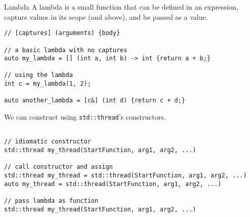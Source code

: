\begin{definitionbox}{Lambda}
    A lambda is a small function that can be defined in an expression, capture values in its scope (and above), and be passed as a value.
    \begin{verbatim}
// [captures] (arguments) {body}

// a basic lambda with no captures
auto my_lambda = [] (int a, int b) -> int {return a + b;}

// using the lambda
int c = my_lambda(1, 2);

auto another_lambda = [c&] (int d) {return c + d;}
    \end{verbatim} 
\end{definitionbox}
We can construct using \texttt{std::thread}'s constructors.
\begin{verbatim}

// idiomatic constructor
std::thread my_thread(StartFunction, arg1, arg2, ...)

// call constructor and assign
std::thread my_thread = std::thread(StartFunction, arg1, arg2, ...)
auto my_thread = std::thread(StartFunction, arg1, arg2, ...)

// pass lambda as function
std::thread my_thread(StartFunction, arg1, arg2, ...)
\end{verbatim} 
